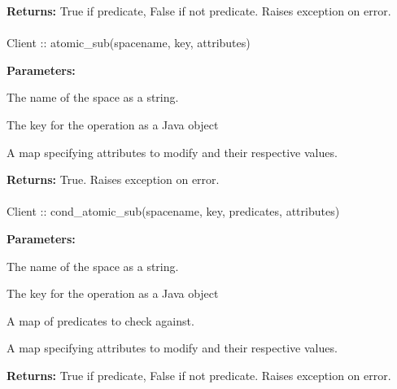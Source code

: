 \noindent\textbf{Returns:}
True if predicate, False if not predicate.  Raises exception on error.

\paragraph{}
\label{api:java:atomic_sub}
\begin{javacode}
Client :: atomic_sub(spacename, key, attributes)
\end{javacode}


\noindent\textbf{Parameters:}
\begin{description}[labelindent=\widthof{{\code{attributes}}},leftmargin=*,noitemsep,nolistsep,align=right]
\item[\code{spacename}] The name of the space as a string.
\item[\code{key}] The key for the operation as a Java object
\item[\code{attributes}] A map specifying attributes to modify and their respective values.
\end{description}

\noindent\textbf{Returns:}
True.  Raises exception on error.

\paragraph{}
\label{api:java:cond_atomic_sub}
\begin{javacode}
Client :: cond_atomic_sub(spacename, key, predicates, attributes)
\end{javacode}


\noindent\textbf{Parameters:}
\begin{description}[labelindent=\widthof{{\code{predicates}}},leftmargin=*,noitemsep,nolistsep,align=right]
\item[\code{spacename}] The name of the space as a string.
\item[\code{key}] The key for the operation as a Java object
\item[\code{predicates}] A map of predicates to check against.
\item[\code{attributes}] A map specifying attributes to modify and their respective values.
\end{description}

\noindent\textbf{Returns:}
True if predicate, False if not predicate.  Raises exception on error.

